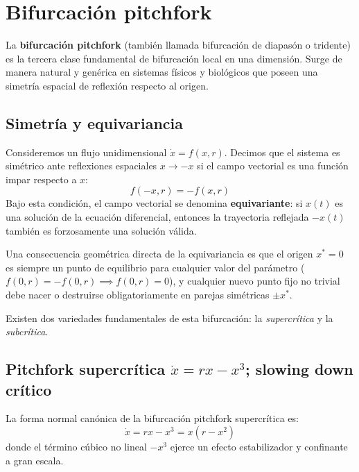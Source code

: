 \section{Bifurcación pitchfork}

La \textbf{bifurcación pitchfork} (también llamada bifurcación de diapasón o tridente) es la tercera clase fundamental de bifurcación local en una dimensión. Surge de manera natural y genérica en sistemas físicos y biológicos que poseen una simetría espacial de reflexión respecto al origen.

\subsection{Simetría y equivariancia}

Consideremos un flujo unidimensional $\dot{x} = f(x, r)$. Decimos que el sistema es simétrico ante reflexiones espaciales $x \to -x$ si el campo vectorial es una función impar respecto a $x$:
\begin{equation}
    f(-x, r) = -f(x, r)
    \label{eq:imparidad_campo}
\end{equation}
Bajo esta condición, el campo vectorial se denomina \textbf{equivariante}: si $x(t)$ es una solución de la ecuación diferencial, entonces la trayectoria reflejada $-x(t)$ también es forzosamente una solución válida.

Una consecuencia geométrica directa de la equivariancia es que el origen $x^* = 0$ es siempre un punto de equilibrio para cualquier valor del parámetro ($f(0, r) = -f(0, r) \implies f(0, r) = 0$), y cualquier nuevo punto fijo no trivial debe nacer o destruirse obligatoriamente en parejas simétricas $\pm x^*$.

Existen dos variedades fundamentales de esta bifurcación: la \emph{supercrítica} y la \emph{subcrítica}.

\subsection{Pitchfork supercrítica $\dot{x} = rx - x^{3}$; slowing down crítico}

La forma normal canónica de la bifurcación pitchfork supercrítica es:
\begin{equation}
    \dot{x} = rx - x^3 = x(r - x^2)
    \label{eq:pitchfork_supercritica}
\end{equation}
donde el término cúbico no lineal $-x^3$ ejerce un efecto estabilizador y confinante a gran escala.

